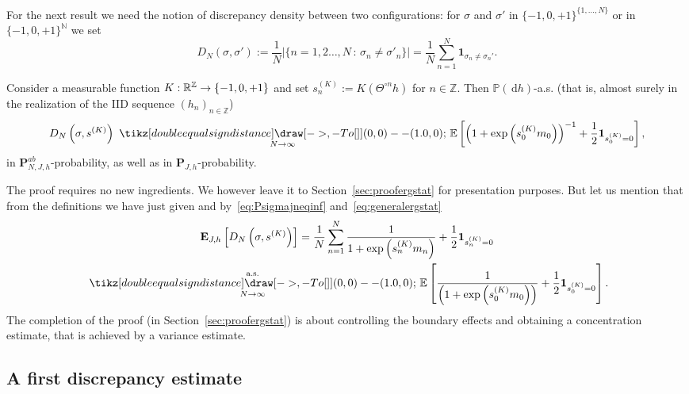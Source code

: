 \documentclass[AHL,Unicode,longabstracts,published]{cedram}
\newlength{\LETTERheight}
\newcommand*{\longto}[1]{\ %
{\tikz[double equal sign distance] \draw [->,-{To[]}] (0,0) -- (#1,0);}\ }
\newcommand{\ind}{\mathbf{1}}
\newcommand{\bP}{\mathbf{P}}
\newcommand{\bE}{\mathbf{E}}
\newcommand{\bbE}{\mathbb{E}}
\newcommand{\bbN}{\mathbb{N}}
\newcommand{\bbP}{\mathbb{P}}
\newcommand{\bbR}{\mathbb{R}}
\newcommand{\bbZ}{\mathbb{Z}}
\newcommand{\dd}{\,\mathrm{d}}
\newcommand{\gs}{\sigma}
\renewcommand*{\to}{\mathchoice{\longrightarrow}{\rightarrow}{\rightarrow}{\rightarrow}}
\begin{document}
For the next result we need the notion of discrepancy density between two configurations: for $\sigma$ and $\sigma'$ in $ \{-1, 0, +1\}^{\{1, \dots, N\}}$ or in $\{-1, 0, +1\}^{\bbN}$ we set
\begin{equation}\label{eq:D_N}
D_N(\sigma, \sigma'):= \frac1N \left | \bigl\{ n=1,2 \dots, N \,:\, \gs_n \neq \gs'_n\bigr\}\right| = \frac1N \sum_{n=1}^N \ind_{\gs_n\neq \gs_n'}.
\end{equation}

\begin{prop}\label{th:ergstatK}
Consider a measurable function $K: \bbR^\bbZ\to \{-1,0, +1\}$ and set $s^{(K)}_n:=K(\Theta^{\circ n} h)$ for $n\in\bbZ$. Then $\bbP(\dd h)$-a.s. (that is, almost surely in the realization of the IID sequence $(h_n)_{n\in\bbZ}$)
\begin{equation}\label{eq:ergstatK}
D_N\left(\sigma, s^{(K)}\right) \underset{N\to\infty}{{\longto{1.0}}} \bbE\left[\left(1+\exp\left(s^{(K)}_0 m_0\right)\right)^{-1}+\frac12\ind_{s^{(K)}_0 =0}\right],
\end{equation}
in $\bP^{ab}_{N, J, h}$-probability, as well as in $\bP_{J, h}$-probability.
\end{prop}


The proof requires no new ingredients. We however leave it to Section~\ref{sec:proofergstat} for presentation purposes. But let us mention that from the definitions we have just given and by~\eqref{eq:Psigmajneqinf} and~\eqref{eq:generalergstat}
\begin{multline}
\label{eq:ergstatconvinexpect}
\bE_{J, h}\left[D_N\left(\sigma, s^{(K)}\right) \right]= \frac 1 N\sum_{n=1}^N \frac1{1+\exp\left(s^{(K)}_n m_n\right)}+\frac12\ind_{s^{(K)}_n =0}
\\
\underset{N \to \infty}{\overset{\text{a.s.}}{\longto{1.0}}}
\bbE\left[\frac 1{\left(1+\exp\left(s^{(K)}_0 m_0\right)\right)}+\frac12\ind_{s^{(K)}_0 =0}\right].
\end{multline}
The completion of the proof (in Section~\ref{sec:proofergstat}) is about controlling the boundary effects and obtaining a concentration estimate, that is achieved by a variance estimate.



\subsection{A first discrepancy estimate}
\end{document}
